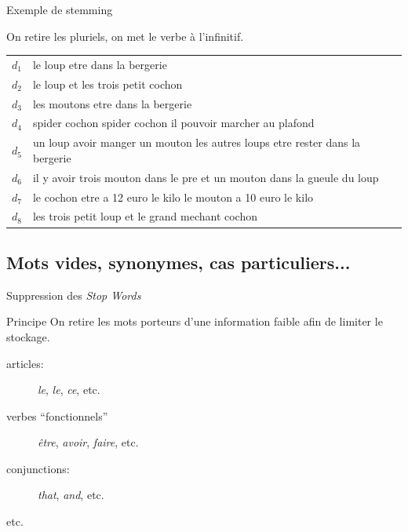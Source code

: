 \begin{frame}{Exemple de stemming}

On retire les pluriels, on met le verbe à l'infinitif.

\vfill

\begin{tabular}{>{\color{structure.fg}}ll}
     $d_1$&le loup etre dans la bergerie\\
     $d_2$&le loup et les trois petit cochon\\
     $d_3$&les moutons etre dans la bergerie\\
     $d_4$&spider cochon spider cochon il pouvoir marcher au plafond\\
     $d_5$&un loup avoir manger un mouton les autres loups etre rester dans la bergerie\\
     $d_6$&il y avoir trois mouton dans le pre et un mouton dans la gueule du loup\\
     $d_7$&le cochon etre a 12 euro le kilo le mouton a 10 euro le kilo\\
     $d_8$&les trois petit loup et le grand mechant cochon\\
\end{tabular}

\end{frame}


\subsection{Mots vides, synonymes, cas particuliers...}


\begin{frame}{Suppression des \textit{Stop Words}}

\begin{defblock}{Principe}
On retire les mots porteurs d'une information faible afin de limiter le stockage.
\end{defblock}

\begin{description}
\item[articles:] \emph{le}, \emph{le}, \emph{ce}, etc.

\item[verbes ``fonctionnels''] \emph{être}, \emph{avoir}, \emph{faire}, etc.

\item[conjunctions:] \emph{that}, \emph{and}, etc.

\item[etc.]
\end{description}


\begin{blocgauche}
\end{blocgauche}

\end{frame}



